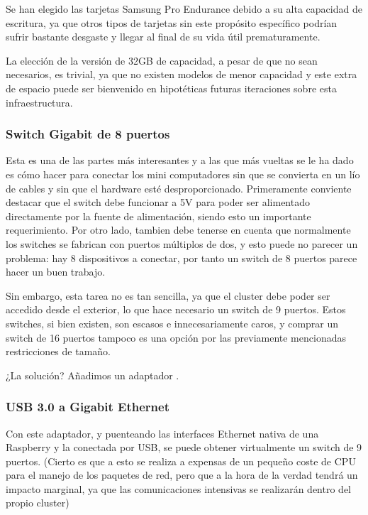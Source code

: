 Se han elegido las tarjetas Samsung Pro Endurance debido a su alta capacidad de escritura, ya que otros tipos de tarjetas sin este propósito específico podrían sufrir bastante desgaste y llegar al final de su vida útil prematuramente. 

La elección de la versión de 32GB de capacidad, a pesar de que no sean necesarios, es trivial, ya que no existen modelos de menor capacidad y este extra de espacio puede ser bienvenido en hipotéticas futuras iteraciones sobre esta infraestructura.


\subsubsection{Switch Gigabit de 8 puertos}
Esta es una de las partes más interesantes y a las que más vueltas se le ha dado es cómo hacer para conectar los mini computadores sin que se convierta en un lío de cables y sin que el hardware esté desproporcionado. Primeramente conviente destacar que el switch debe funcionar a 5V para poder ser alimentado directamente por la fuente de alimentación, siendo esto un importante requerimiento.
Por otro lado, tambien debe tenerse en cuenta que normalmente los switches se fabrican con puertos múltiplos de dos, y esto puede no parecer un problema: hay 8 dispositivos a conectar, por tanto un switch de 8 puertos parece hacer un buen trabajo.


Sin embargo, esta tarea no es tan sencilla, ya que el cluster debe poder ser accedido desde el exterior, lo que hace necesario un switch de 9 puertos. Estos switches, si bien existen, son escasos e innecesariamente caros, y comprar un switch de 16 puertos tampoco es una opción por las previamente mencionadas restricciones de tamaño.

¿La solución? Añadimos un adaptador .

\subsubsection{USB 3.0 a Gigabit Ethernet}
\label{sssec:usb30age}
Con este adaptador, y puenteando las interfaces Ethernet nativa de una Raspberry y la conectada por USB, se puede obtener virtualmente un switch de 9 puertos. (Cierto es que a esto se realiza a expensas de un pequeño coste de CPU para el manejo de los paquetes de red, pero que a la hora de la verdad tendrá un impacto marginal, ya que las comunicaciones intensivas se realizarán dentro del propio cluster)

